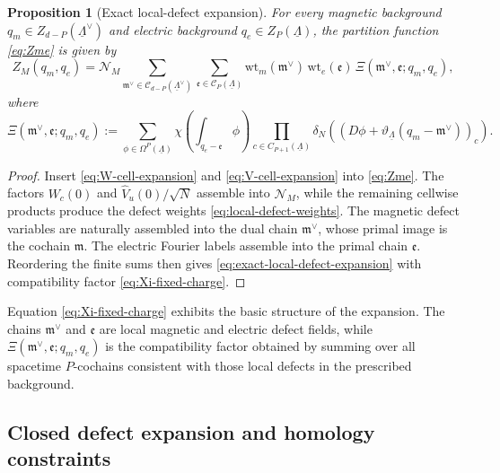 \documentclass[dvipsnames,a4paper]{article}
\numberwithin{equation}{section}
\newtheorem{prop}[theorem]{Proposition}
\theoremstyle{definition}
\theoremstyle{remark}
\newcommand{\wt}{\mathrm{wt}}
\begin{document}
\begin{prop}[Exact local-defect expansion]
	\label{prop:exact-local-defect-expansion}
	For every magnetic background \(q_m\in Z_{d-P}(\underline\Lambda^\vee)\) and electric
	background \(q_e\in Z_P(\underline\Lambda)\), the partition function \eqref{eq:Zme} is given by
	\begin{equation}
		Z_M(q_m,q_e)
		=
		\mathcal N_M
		\sum_{\mathfrak m^\vee\in \mathcal C_{d-P}(\underline\Lambda^\vee)}
		\sum_{\mathfrak e\in \mathcal C_P(\underline\Lambda)}
		\wt_m(\mathfrak m^\vee)\,\wt_e(\mathfrak e)\,
		\Xi(\mathfrak m^\vee,\mathfrak e;q_m,q_e),
		\label{eq:exact-local-defect-expansion}
	\end{equation}
	where
	\begin{equation}
		\Xi(\mathfrak m^\vee,\mathfrak e;q_m,q_e)
		:=
		\sum_{\phi\in \Omega^P(\underline\Lambda)}
		\chi \left(\int_{q_e-\mathfrak e}\phi\right)
		\prod_{c\in C_{P+1}(\underline\Lambda)}
		\delta_N \left((D\phi+\vartheta_{\underline\Lambda}(q_m-\mathfrak m^\vee))_c\right).
		\label{eq:Xi-fixed-charge}
	\end{equation}
\end{prop}

\begin{proof}
	Insert \eqref{eq:W-cell-expansion} and \eqref{eq:V-cell-expansion} into
	\eqref{eq:Zme}. The factors \(W_c(0)\) and
	\(\widehat V_u(0)/\sqrt N\) assemble into \(\mathcal N_M\), while the remaining
	cellwise products produce the defect weights \eqref{eq:local-defect-weights}. The
	magnetic defect variables are naturally assembled into the dual chain
	\(\mathfrak m^\vee\), whose primal image is the cochain \(\mathfrak m\). The electric
	Fourier labels assemble into the primal chain \(\mathfrak e\). Reordering the finite sums
	then gives \eqref{eq:exact-local-defect-expansion} with compatibility factor
	\eqref{eq:Xi-fixed-charge}.
\end{proof}

Equation \eqref{eq:Xi-fixed-charge} exhibits the basic structure of the expansion. The
chains \(\mathfrak m^\vee\) and \(\mathfrak e\) are local magnetic and electric defect
fields, while \(\Xi(\mathfrak m^\vee,\mathfrak e;q_m,q_e)\) is the compatibility factor
obtained by summing over all spacetime \(P\)-cochains consistent with those local defects in
the prescribed background.

\subsection{Closed defect expansion and homology constraints}
\label{sec:closedDefectGas}
\end{document}
